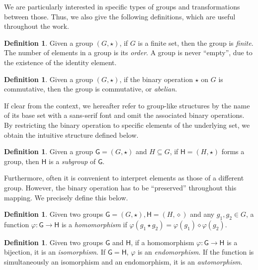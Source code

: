 \documentclass[12pt, a4paper, oneside]{memoir}
\theoremstyle{definition}
\newtheorem{definition}[theorem]{Definition}
\begin{document}
We are particularly interested in specific types of groups and transformations between those. Thus, we also give the following definitions, which are useful throughout the work.

\begin{definition}
  Given a group $(G, \star)$, if $G$ is a finite set, then the group is \emph{finite}. The number of elements in a group is its \emph{order}. A group is never ``empty'', due to the existence of the identity element.
\end{definition}

\begin{definition}
  Given a group $(G, \star)$, if the binary operation $\star$ on $G$ is commutative, then the group is commutative, or \emph{abelian}.
\end{definition}

If clear from the context, we hereafter refer to group-like structures by the name of its base set with a sans-serif font and omit the associated binary operations. By restricting the binary operation to specific elements of the underlying set, we obtain the intuitive structure defined below.

\begin{definition}\label{def:subgroup}
  Given a group $\textsf{G} = (G, \star)$ and $H \subseteq G$, if $\mathsf{H} = (H, \star)$ forms a group, then $\mathsf{H}$ is a \emph{subgroup} of $\mathsf{G}$.
\end{definition}

Furthermore, often it is convenient to interpret elements as those of a different group. However, the binary operation has to be ``preserved'' throughout this mapping. We precisely define this below.

\begin{definition}\label{def:group-hom}
  Given two groups $\mathsf{G} = (G, \star), \mathsf{H} = (H, \diamond)$ and any $g_{1}, g_{2} \in G$, a function $\varphi : \mathsf{G} \to \mathsf{H}$ is a \emph{homomorphism} if $\varphi(g_{1} \star g_{2}) = \varphi(g_{1}) \diamond \varphi(g_{2})$.
\end{definition}

\begin{definition}\label{def:group-iso}
  Given two groups $\mathsf{G}$ and $\mathsf{H}$, if a homomorphism $\varphi : \mathsf{G} \to \mathsf{H}$ is a bijection, it is an \emph{isomorphism}. If $\mathsf{G} = \mathsf{H}$, $\varphi$ is an \emph{endomorphism}. If the function is simultaneously an isomorphism and an endomorphism, it is an \emph{automorphism}.
\end{definition}
\end{document}
